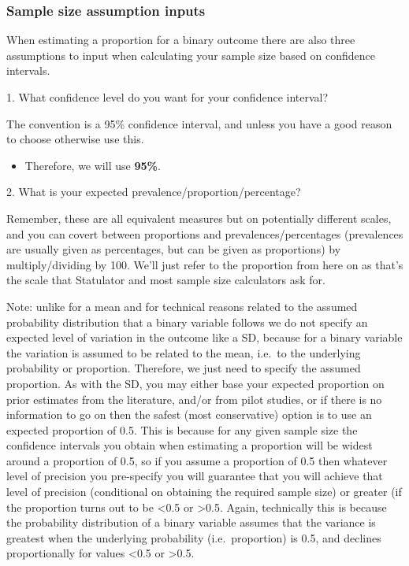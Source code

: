 \documentclass[
]{book}
\providecommand{\tightlist}{%
  \setlength{\itemsep}{0pt}\setlength{\parskip}{0pt}}
\begin{document}
\hypertarget{sample-size-assumption-inputs-1}{%
\subsubsection{Sample size assumption inputs}\label{sample-size-assumption-inputs-1}}

When estimating a proportion for a binary outcome there are also three assumptions to input when calculating your sample size based on confidence intervals.

1. What confidence level do you want for your confidence interval?

The convention is a 95\% confidence interval, and unless you have a good reason to choose otherwise use this.

\begin{itemize}
\tightlist
\item
  Therefore, we will use \textbf{95\%}.
\end{itemize}

2. What is your expected prevalence/proportion/percentage?

Remember, these are all equivalent measures but on potentially different scales, and you can covert between proportions and prevalences/percentages (prevalences are usually given as percentages, but can be given as proportions) by multiply/dividing by 100. We'll just refer to the proportion from here on as that's the scale that Statulator and most sample size calculators ask for.

Note: unlike for a mean and for technical reasons related to the assumed probability distribution that a binary variable follows we do not specify an expected level of variation in the outcome like a SD, because for a binary variable the variation is assumed to be related to the mean, i.e.~to the underlying probability or proportion. Therefore, we just need to specify the assumed proportion. As with the SD, you may either base your expected proportion on prior estimates from the literature, and/or from pilot studies, or if there is no information to go on then the safest (most conservative) option is to use an expected proportion of 0.5. This is because for any given sample size the confidence intervals you obtain when estimating a proportion will be widest around a proportion of 0.5, so if you assume a proportion of 0.5 then whatever level of precision you pre-specify you will guarantee that you will achieve that level of precision (conditional on obtaining the required sample size) or greater (if the proportion turns out to be \textless0.5 or \textgreater0.5. Again, technically this is because the probability distribution of a binary variable assumes that the variance is greatest when the underlying probability (i.e.~proportion) is 0.5, and declines proportionally for values \textless0.5 or \textgreater0.5.
\end{document}
